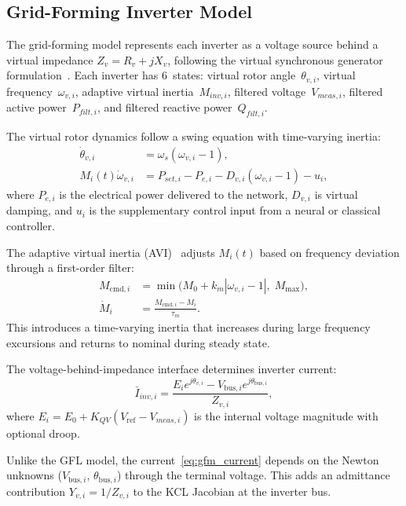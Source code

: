\documentclass[11pt]{article}
\begin{document}
\subsection{Grid-Forming Inverter Model}
\label{sec:gfm_model}

The grid-forming model represents each inverter as a voltage source
behind a virtual impedance $Z_v = R_v + jX_v$, following the virtual
synchronous generator
formulation~\cite{Zhong11Synchronverters, DArco13VSMClassification}.
Each inverter has 6~states: virtual rotor angle~$\theta_{v,i}$,
virtual frequency~$\omega_{v,i}$, adaptive virtual
inertia~$M_{inv,i}$, filtered voltage~$V_{meas,i}$, filtered active
power~$P_{filt,i}$, and filtered reactive power~$Q_{filt,i}$.

The virtual rotor dynamics follow a swing equation with time-varying
inertia:
\begin{align}
  \dot{\theta}_{v,i} &= \omega_s(\omega_{v,i} - 1),
    \label{eq:gfm_theta} \\
  M_i(t) \dot{\omega}_{v,i} &= P_{set,i} - P_{e,i}
    - D_{v,i}(\omega_{v,i} - 1) - u_i,
    \label{eq:gfm_swing}
\end{align}
where $P_{e,i}$ is the electrical power delivered to the network,
$D_{v,i}$ is virtual damping, and $u_i$ is the supplementary control
input from a neural or classical controller.

The adaptive virtual inertia (AVI)~\cite{Alipoor15AVI} adjusts
$M_i(t)$ based on frequency deviation through a first-order filter:
\begin{align}
  M_{\mathrm{cmd},i} &= \min\bigl(M_0 + k_m |\omega_{v,i} - 1|,\;
    M_{\max}\bigr), \label{eq:avi_cmd} \\
  \dot{M}_i &= \frac{M_{\mathrm{cmd},i} - M_i}{\tau_m}.
    \label{eq:avi_dyn}
\end{align}
This introduces a time-varying inertia that increases during large
frequency excursions and returns to nominal during steady state.

The voltage-behind-impedance interface determines inverter current:
\begin{equation}
  \bar{I}_{inv,i} = \frac{E_i e^{j\theta_{v,i}}
    - V_{\mathrm{bus},i} e^{j\theta_{\mathrm{bus},i}}}{Z_{v,i}},
  \label{eq:gfm_current}
\end{equation}
where $E_i = E_0 + K_{QV}(V_{\mathrm{ref}} - V_{meas,i})$ is the
internal voltage magnitude with optional droop.

Unlike the GFL model, the current~\eqref{eq:gfm_current} depends
on the Newton unknowns ($V_{\mathrm{bus},i}$, $\theta_{\mathrm{bus},i}$)
through the terminal voltage.  This adds an admittance contribution
$Y_{v,i} = 1/Z_{v,i}$ to the KCL Jacobian at the inverter bus.
\end{document}
